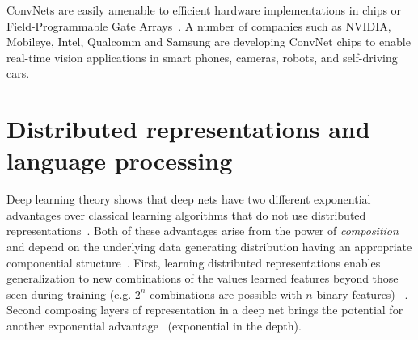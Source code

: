 \documentclass[10pts]{article}
\newcommand{\citep}[1]{\cite{#1}}
\begin{document}
ConvNets are easily amenable to efficient hardware implementations in
chips or Field-Programmable Gate
Arrays~\cite{boser-92,farabet-suml-11}.  A number of companies such as
NVIDIA, Mobileye, Intel, Qualcomm and Samsung are developing ConvNet
chips to enable real-time vision applications in smart phones,
cameras, robots, and self-driving cars.



\section{Distributed representations and language processing}

Deep learning theory shows that deep nets have two different
exponential advantages over classical learning algorithms that do not
use distributed
representations~\citep{Bengio-localfailure-NIPS-2006-small}. Both of
these advantages arise from the power of {\em composition} and depend
on the underlying data generating distribution having an appropriate
componential structure~\citep{Bengio-Courville-Vincent-TPAMI2013}.
First, learning distributed representations enables generalization to
new combinations of the values learned features beyond those seen
during training (e.g. $2^n$ combinations
are possible with $n$ binary features) ~\citep{Bengio-2009-book,Montufar+Morton-2014}.
Second composing layers of representation in a deep net brings the potential for another
exponential advantage~\citep{Montufar-et-al-NIPS2014} (exponential in
the depth).
\end{document}

